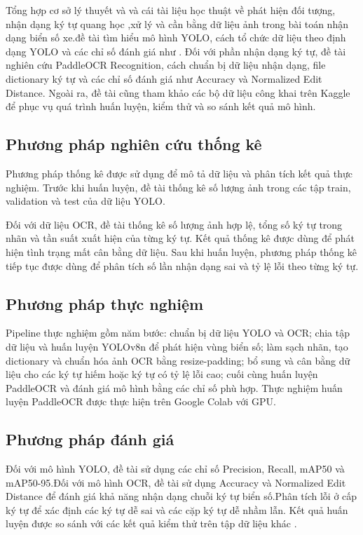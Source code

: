 \documentclass[13pt,a4paper]{report}
\begin{document}
Tổng hợp cơ sở lý thuyết và và cái tài liệu học thuật về phát hiện đối tượng, nhận dạng ký tự quang học ,xử lý và cần bằng dữ liệu ảnh trong bài toán nhận dạng biển số xe.đề tài tìm hiểu mô hình YOLO, cách tổ chức dữ liệu theo định dạng YOLO và các chỉ số đánh giá như . Đối với phần nhận dạng ký tự, đề tài nghiên cứu PaddleOCR Recognition, cách chuẩn bị dữ liệu nhận dạng, file dictionary ký tự và các chỉ số đánh giá như Accuracy và Normalized Edit Distance. Ngoài ra, đề tài cũng tham khảo các bộ dữ liệu công khai trên Kaggle để phục vụ quá trình huấn luyện, kiểm thử và so sánh kết quả mô hình.

\subsection{Phương pháp nghiên cứu thống kê}

Phương pháp thống kê được sử dụng để mô tả dữ liệu và phân tích kết quả thực nghiệm. Trước khi huấn luyện, đề tài thống kê số lượng ảnh trong các tập train, validation và test của dữ liệu YOLO.

Đối với dữ liệu OCR, đề tài thống kê số lượng ảnh hợp lệ, tổng số ký tự trong nhãn và tần suất xuất hiện của từng ký tự. Kết quả thống kê được dùng để phát hiện tình trạng mất cân bằng dữ liệu. Sau khi huấn luyện, phương pháp thống kê tiếp tục được dùng để phân tích số lần nhận dạng sai và tỷ lệ lỗi theo từng ký tự.

\subsection{Phương pháp thực nghiệm}

Pipeline thực nghiệm gồm năm bước: chuẩn bị dữ liệu YOLO và OCR; chia tập dữ liệu và huấn luyện YOLOv8n để phát hiện vùng biển số; làm sạch nhãn, tạo dictionary và chuẩn hóa ảnh OCR bằng resize-padding; bổ sung và cân bằng dữ liệu cho các ký tự hiếm hoặc ký tự có tỷ lệ lỗi cao; cuối cùng huấn luyện PaddleOCR và đánh giá mô hình bằng các chỉ số phù hợp. Thực nghiệm huấn luyện PaddleOCR được thực hiện trên Google Colab với GPU.
\subsection{Phương pháp đánh giá}

Đối với mô hình YOLO, đề tài sử dụng các chỉ số Precision, Recall, mAP50 và mAP50-95.Đối với mô hình OCR, đề tài sử dụng Accuracy và Normalized Edit Distance để đánh giá khả năng nhận dạng chuỗi ký tự biển số.Phân tích lỗi ở cấp ký tự để xác định các ký tự dễ sai và các cặp ký tự dễ nhầm lẫn.  Kết quả huấn luyện được so sánh với
các kết quả kiểm thử trên tập dữ liệu khác .
\end{document}
